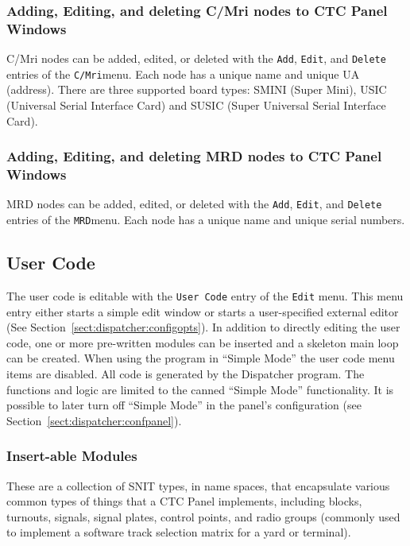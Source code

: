 \subsubsection{Adding, Editing, and deleting C/Mri nodes to CTC Panel
Windows}

C/Mri nodes can be added, edited, or deleted with the \verb=Add=,
\verb=Edit=, and \verb=Delete= entries of the \verb=C/Mri=menu. Each
node has a unique name and unique UA (address).  There are three
supported board types: SMINI (Super Mini), USIC (Universal Serial
Interface Card) and SUSIC (Super Universal Serial Interface Card).

\subsubsection{Adding, Editing, and deleting MRD nodes to CTC Panel
Windows}

MRD nodes can be added, edited, or deleted with the \verb=Add=,
\verb=Edit=, and \verb=Delete= entries of the \verb=MRD=menu. Each
node has a unique name and unique serial numbers.

\subsection{User Code}

The user code is editable with the \verb=User Code= entry of the
\verb=Edit= menu.  This menu entry either starts a simple edit window
or starts a user-specified external editor (See
Section~\ref{sect:dispatcher:configopts}).  In addition to directly
editing the user code, one or more pre-written modules can be inserted
and a skeleton main loop can be created. When using the program in
``Simple Mode'' the user code menu items are disabled.  All code is
generated by the Dispatcher program.  The functions and logic are
limited to the canned ``Simple Mode'' functionality.  It is possible to
later turn off ``Simple Mode'' in the panel's configuration (see
Section~\ref{sect:dispatcher:confpanel}).

\subsubsection{Insert-able Modules}

These are a collection of SNIT types, in name spaces, that encapsulate
various common types of things that a CTC Panel implements, including
blocks, turnouts, signals, signal plates, control points, and radio
groups (commonly used to implement a software track selection matrix for
a yard or terminal).

